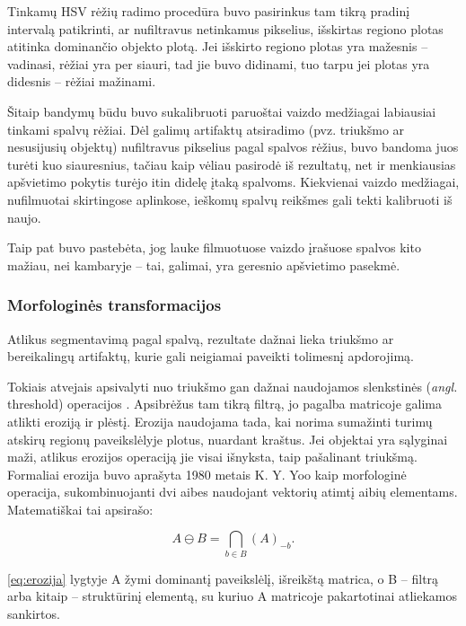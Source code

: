 \documentclass{VUMIFPSbakalaurinis}
\begin{document}
Tinkamų HSV rėžių radimo procedūra buvo pasirinkus tam tikrą pradinį intervalą patikrinti, ar nufiltravus netinkamus pikselius, išskirtas regiono plotas atitinka dominančio objekto plotą. Jei išskirto regiono plotas yra mažesnis – vadinasi, rėžiai yra per siauri, tad jie buvo didinami, tuo tarpu jei plotas yra didesnis – rėžiai mažinami. 

Šitaip bandymų būdu buvo sukalibruoti paruoštai vaizdo medžiagai labiausiai tinkami spalvų rėžiai. Dėl galimų artifaktų atsiradimo (pvz. triukšmo ar nesusijusių objektų) nufiltravus pikselius pagal spalvos rėžius, buvo bandoma juos turėti kuo siauresnius, tačiau kaip vėliau pasirodė iš rezultatų, net ir menkiausias apšvietimo pokytis turėjo itin didelę įtaką spalvoms. Kiekvienai vaizdo medžiagai, nufilmuotai skirtingose aplinkose, ieškomų spalvų reikšmes gali tekti kalibruoti iš naujo.

Taip pat buvo pastebėta, jog lauke filmuotuose vaizdo įrašuose spalvos kito mažiau, nei kambaryje – tai, galimai, yra geresnio apšvietimo pasekmė. 

\subsubsection{Morfologinės transformacijos}
Atlikus segmentavimą pagal spalvą, rezultate dažnai lieka triukšmo ar bereikalingų artifaktų, kurie gali neigiamai paveikti tolimesnį apdorojimą.

Tokiais atvejais apsivalyti nuo triukšmo gan dažnai naudojamos slenkstinės (\textit{angl.} threshold) operacijos \cite[112]{SzeliskiCompVision}. Apsibrėžus tam tikrą filtrą, jo pagalba matricoje galima atlikti eroziją ir plėstį. Erozija naudojama tada, kai norima sumažinti turimų atskirų regionų paveikslėlyje plotus, nuardant kraštus. Jei objektai yra sąlyginai maži, atlikus erozijos operaciją jie visai išnyksta, taip pašalinant triukšmą. Formaliai erozija buvo aprašyta 1980 metais K. Y. Yoo \cite{4767941} kaip morfologinė operacija, sukombinuojanti dvi aibes naudojant vektorių atimtį aibių elementams. Matematiškai tai apsirašo: 

\begin{equation}\label{eq:erozija}
	A \ominus B = \bigcap_ {b \in B } (A)_{-b} .
\end{equation}

\ref{eq:erozija} lygtyje A žymi dominantį paveikslėlį, išreikštą matrica, o B – filtrą arba kitaip – struktūrinį elementą, su kuriuo A matricoje pakartotinai atliekamos sankirtos.  
\end{document}
